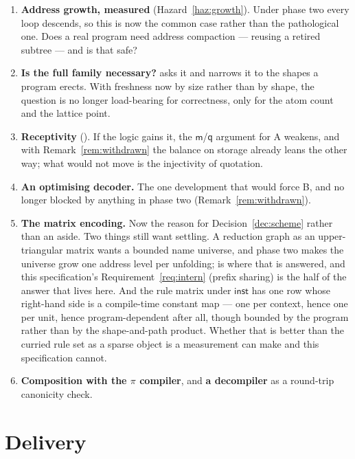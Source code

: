 \documentclass[11pt,a4paper]{article}
\newcommand{\mm}{\mathsf{m}}
\newcommand{\qq}{\mathsf{q}}
\newcommand{\inst}{\mathsf{inst}}
\theoremstyle{definition}
\theoremstyle{plain}
\begin{document}
\begin{enumerate}[leftmargin=1.8em]
\item \textbf{Address growth, measured} (Hazard~\ref{haz:growth}). Under phase
two every loop descends, so this is now the common case rather than the
pathological one. Does a real program need address compaction --- reusing a
retired subtree --- and is that safe?
\item \textbf{Is the full family necessary?} \cite[\S12]{draft3} asks it and
\cite[Rem.~6.15]{draft3} narrows it to the shapes a program erects. With
freshness now by size rather than by shape, the question is no longer
load-bearing for correctness, only for the atom count and the lattice point.
\item \textbf{Receptivity} (\cite[open item~5]{logic}). If the logic gains it,
the $\mm$/$\qq$ argument for A weakens, and with
Remark~\ref{rem:withdrawn} the balance on storage already leans the other way;
what would not move is the injectivity of quotation.
\item \textbf{An optimising decoder.} The one development that would force B,
and no longer blocked by anything in phase two (Remark~\ref{rem:withdrawn}).
\item \textbf{The matrix encoding.} Now the reason for
Decision~\ref{dec:scheme} rather than an aside. Two things still want
settling. A reduction graph as an upper-triangular matrix wants a bounded name
universe, and phase two makes the universe grow one address level per
unfolding; \cite{matspec} is where that is answered, and this specification's
Requirement~\ref{req:intern} (prefix sharing) is the half of the answer that
lives here. And the rule matrix under $\inst$ has one row whose right-hand
side is a compile-time constant map --- one per context, hence one per unit,
hence program-dependent after all, though bounded by the program rather than
by the shape-and-path product. Whether that is better than the curried rule
set as a sparse object is a measurement \cite{matspec} can make and this
specification cannot.
\item \textbf{Composition with the $\pi$ compiler}, and \textbf{a decompiler}
as a round-trip canonicity check.
\end{enumerate}

\section{Delivery}
\end{document}
